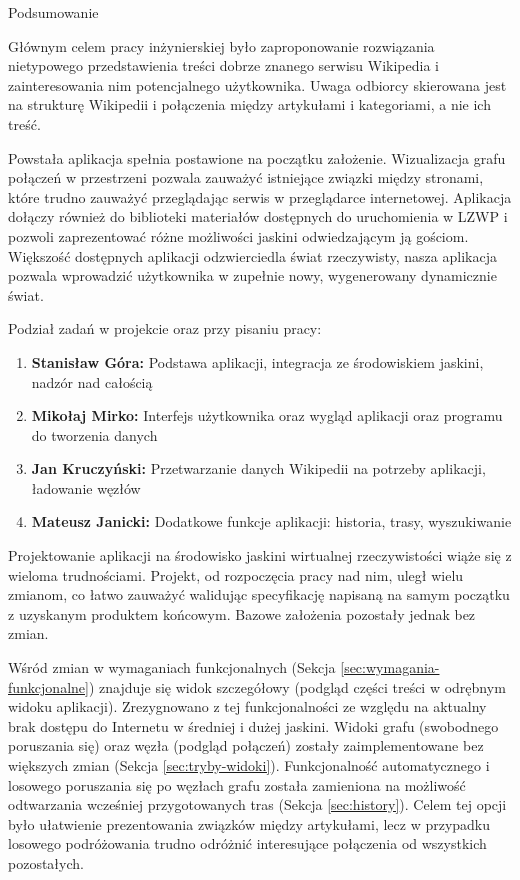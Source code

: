 \begin{chapter}{Podsumowanie}
	\newcommand{\chapterPath}{rozdzialy/7_podsumowanie}
	\label{ch:podsumowanie}
	
	Głównym celem pracy inżynierskiej było zaproponowanie rozwiązania nietypowego przedstawienia treści dobrze znanego serwisu Wikipedia i zainteresowania nim potencjalnego użytkownika. Uwaga odbiorcy skierowana jest na strukturę Wikipedii i połączenia między artykułami i kategoriami, a nie ich treść.

	Powstała aplikacja spełnia postawione na początku założenie. Wizualizacja grafu połączeń w przestrzeni pozwala zauważyć istniejące związki między stronami, które trudno zauważyć przeglądając serwis w przeglądarce internetowej. Aplikacja dołączy również do biblioteki materiałów dostępnych do uruchomienia w LZWP i pozwoli zaprezentować różne możliwości jaskini odwiedzającym ją gościom. Większość dostępnych aplikacji odzwierciedla świat rzeczywisty, nasza aplikacja pozwala wprowadzić użytkownika w zupełnie nowy, wygenerowany dynamicznie świat.

	\noindent Podział zadań w projekcie oraz przy pisaniu pracy:
	\begin{enumerate}[label=\textbullet]
		\item \textbf{Stanisław Góra:} \newline Podstawa aplikacji, integracja ze środowiskiem jaskini, nadzór nad całością
		\item \textbf{Mikołaj Mirko:} \newline Interfejs użytkownika oraz wygląd aplikacji oraz programu do tworzenia danych
		\item \textbf{Jan Kruczyński:} \newline Przetwarzanie danych Wikipedii na potrzeby aplikacji, ładowanie węzłów
		\item \textbf{Mateusz Janicki:} \newline Dodatkowe funkcje aplikacji: historia, trasy, wyszukiwanie
	\end{enumerate}
	
	Projektowanie aplikacji na środowisko jaskini wirtualnej rzeczywistości wiąże się z wieloma trudnościami. Projekt, od rozpoczęcia pracy nad nim, uległ wielu zmianom, co łatwo zauważyć walidując specyfikację napisaną na samym początku z uzyskanym produktem końcowym. Bazowe założenia pozostały jednak bez zmian.

	Wśród zmian w wymaganiach funkcjonalnych (Sekcja \ref{sec:wymagania-funkcjonalne}) znajduje się widok szczegółowy (podgląd części treści w odrębnym widoku aplikacji). Zrezygnowano z tej funkcjonalności ze względu na aktualny brak dostępu do Internetu w średniej i dużej jaskini. Widoki grafu (swobodnego poruszania się) oraz węzła (podgląd połączeń) zostały zaimplementowane bez większych zmian (Sekcja \ref{sec:tryby-widoki}). Funkcjonalność automatycznego i losowego poruszania się po węzłach grafu została zamieniona na możliwość odtwarzania wcześniej przygotowanych tras (Sekcja \ref{sec:history}). Celem tej opcji było ułatwienie prezentowania związków między artykułami, lecz w przypadku losowego podróżowania trudno odróżnić interesujące połączenia od wszystkich pozostałych.


\end{chapter}
